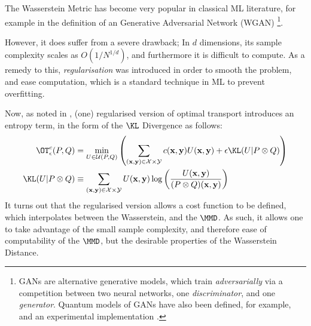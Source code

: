 The Wasserstein Metric has become very popular in classical ML literature, for example in the definition of an Generative Adversarial Network (WGAN) \footnote{GANs are alternative generative models, which train \textit{adversarially} via a competition between two neural networks, one \textit{discriminator}, and one \textit{generator}. Quantum models of GANs have also been defined, for example,  and an experimental implementation .}. 

However, it does suffer from a severe drawback;  In $d$ dimensions, its sample complexity scales as $O(1/N^{1/d})$, and furthermore it is difficult to compute. As a remedy to this, \textit{regularisation} was introduced in order to smooth the problem, and ease computation, which is a standard technique in ML to prevent overfitting.

Now, as noted in , (one) regularised version of optimal transport introduces an entropy term, in the form of the $\KL$ Divergence as follows:
\begin{align}
\OT^c_\epsilon(P, Q) &=  \min\limits_{U \in \mathcal{U}(P, Q)}\left(\sum\limits_{(\mathbf{x}, \mathbf{y}) \in \mathcal{X}\times\mathcal{Y}} c(\mathbf{x}, \mathbf{y})U(\mathbf{x}, \mathbf{y}) + \epsilon \KL(U|P \otimes Q)\right) \label{wassersteinregularised}\\
\KL(U|P \otimes Q) &\equiv \sum\limits_{(\mathbf{x}, \mathbf{y}) \in \mathcal{X}\times\mathcal{Y}} U(\mathbf{x}, \mathbf{y}) \log\left(\frac{U(\mathbf{x}, \mathbf{y})}{(P\otimes Q )(\mathbf{x}, \mathbf{y})}\right)
\end{align}
It turns out that the regularised version allows a cost function to be defined, which interpolates between the Wasserstein, and the $\MMD$. As such, it allows one to take advantage of the small sample complexity, and therefore ease of computability of the $\MMD$, but the desirable properties of the Wasserstein Distance.

